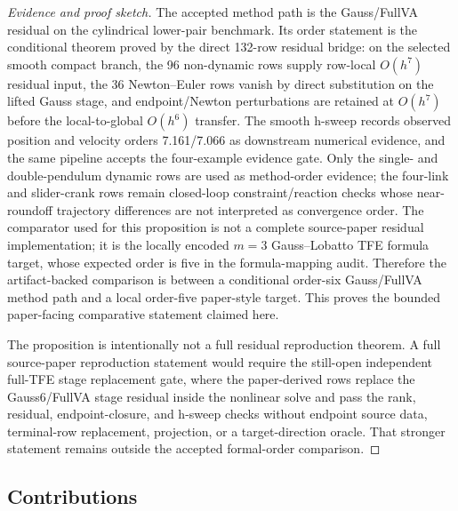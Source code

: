 \documentclass[11pt]{article}
\newcommand{\tfe}{TFE}
\begin{document}
\begin{proof}[Evidence and proof sketch]
The accepted method path is the Gauss/FullVA residual on the cylindrical
lower-pair benchmark.  Its order statement is the conditional theorem proved
by the direct 132-row residual bridge: on the selected smooth compact branch,
the 96 non-dynamic rows supply row-local \(O(h^7)\) residual input, the 36
Newton--Euler rows vanish by direct substitution on the lifted Gauss stage,
and endpoint/Newton perturbations are retained at \(O(h^7)\) before the
local-to-global \(O(h^6)\) transfer.  The smooth h-sweep records observed
position and velocity orders 7.161/7.066 as downstream numerical evidence, and
the same pipeline accepts the four-example evidence gate.  Only the single-
and double-pendulum dynamic rows are used as method-order evidence; the
four-link and slider-crank rows remain closed-loop constraint/reaction checks
whose near-roundoff trajectory differences are not interpreted as convergence
order.  The comparator used for this proposition is not a complete
source-paper residual implementation; it is the locally encoded $m=3$
Gauss--Lobatto \tfe{} formula target, whose expected order is five in the
formula-mapping audit.  Therefore the artifact-backed comparison is between a
conditional order-six Gauss/FullVA method path and a local order-five
paper-style target.  This proves the bounded paper-facing comparative
statement claimed here.

The proposition is intentionally not a full residual reproduction theorem.  A
full source-paper reproduction statement would require the still-open
independent full-\tfe{} stage replacement gate, where the paper-derived rows
replace the Gauss6/FullVA stage residual inside the nonlinear solve and pass
the rank, residual, endpoint-closure, and h-sweep checks without endpoint
source data, terminal-row replacement, projection, or a target-direction
oracle.  That stronger statement remains outside the accepted
formal-order comparison.
\end{proof}

\subsection{Contributions}
\end{document}
